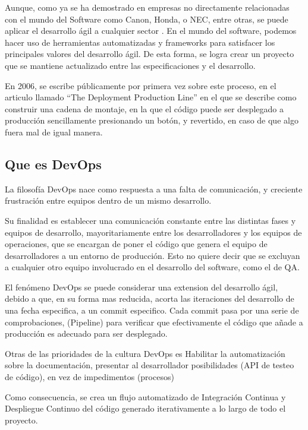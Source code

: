 \documentclass[12pt]{report} %
\begin{document}
Aunque, como ya se ha demostrado en empresas no directamente relacionadas con el mundo del Software como Canon, Honda, o NEC, entre otras, se puede aplicar el desarrollo ágil a cualquier sector \cite{Hirotaka1986}.
En el mundo del software, podemos hacer uso de herramientas automatizadas y frameworks para satisfacer los principales valores del desarrollo ágil.
De esta forma, se logra crear un proyecto que se mantiene actualizado entre las especificaciones y el desarrollo.

En 2006, se escribe públicamente por primera vez sobre este proceso, en el articulo llamado ``The Deployment Production Line'' en el que se describe como construir una cadena de montaje, en la que el código puede ser desplegado a producción sencillamente presionando un botón, y revertido, en caso de que algo fuera mal de igual manera. \cite{10.1109/AGILE.2006.53}

\subsection{Que es DevOps}


La filosofía DevOps nace como respuesta a una falta de comunicación, y creciente frustración entre equipos dentro de un mismo desarrollo.

Su finalidad es establecer una comunicación constante entre las distintas fases y equipos de desarrollo, mayoritariamente entre los desarrolladores y los equipos de operaciones, que se encargan de poner el código que genera el equipo de desarrolladores a un entorno de producción. Esto no quiere decir que se excluyan a cualquier otro equipo involucrado en el desarrollo del software, como el de QA.

El fenómeno DevOps se puede considerar una extension del desarrollo ágil, debido a que, en su forma mas reducida, acorta las iteraciones del desarrollo de una fecha especifica, a un commit especifico. \cite{dobra2018}
Cada commit pasa por una serie de comprobaciones, (Pipeline) para verificar que efectivamente el código que añade a producción es adecuado para ser desplegado.

Otras de las prioridades de la cultura DevOps es Habilitar la automatización sobre la documentación, presentar al desarrollador posibilidades (API de testeo de código), en vez de impedimentos (procesos)

Como consecuencia, se crea un flujo automatizado de Integración Continua y Despliegue Continuo del código generado iterativamente a lo largo de todo el proyecto.
\end{document}
